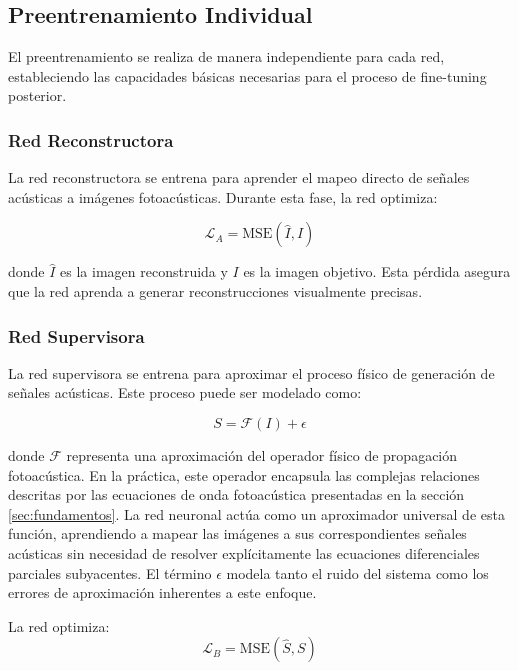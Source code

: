 \subsection{Preentrenamiento Individual}

El preentrenamiento se realiza de manera independiente para cada red, estableciendo las capacidades básicas necesarias para el proceso de fine-tuning posterior.

\subsubsection{Red Reconstructora}
La red reconstructora se entrena para aprender el mapeo directo de señales acústicas a imágenes fotoacústicas. Durante esta fase, la red optimiza:

\begin{equation}
    \mathcal{L}_A = \text{MSE}(\hat{I}, I)
\end{equation}

donde $\hat{I}$ es la imagen reconstruida y $I$ es la imagen objetivo. Esta pérdida asegura que la red aprenda a generar reconstrucciones visualmente precisas.

\subsubsection{Red Supervisora}
La red supervisora se entrena para aproximar el proceso físico de generación de señales acústicas. Este proceso puede ser modelado como:

\begin{equation}
    S = \mathcal{F}(I) + \epsilon
\end{equation}

donde $\mathcal{F}$ representa una aproximación del operador físico de propagación fotoacústica. En la práctica, este operador encapsula las complejas relaciones descritas por las ecuaciones de onda fotoacústica presentadas en la sección \ref{sec:fundamentos}. La red neuronal actúa como un aproximador universal de esta función, aprendiendo a mapear las imágenes a sus correspondientes señales acústicas sin necesidad de resolver explícitamente las ecuaciones diferenciales parciales subyacentes. El término $\epsilon$ modela tanto el ruido del sistema como los errores de aproximación inherentes a este enfoque.

La red optimiza:
\begin{equation}
    \mathcal{L}_B = \text{MSE}(\hat{S}, S)
\end{equation}


